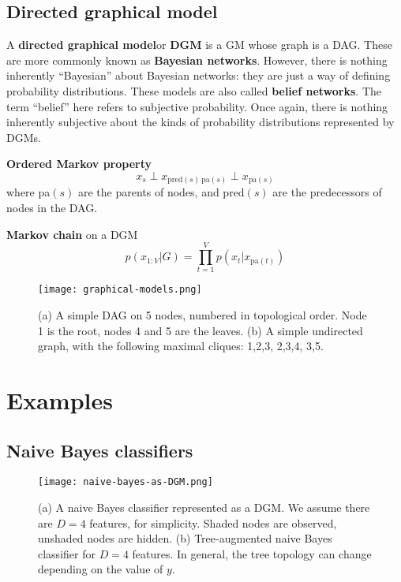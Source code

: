 \subsection{Directed graphical model}
A \textbf{directed graphical model}or \textbf{DGM} is a GM whose graph is a DAG. These are more commonly known as \textbf{Bayesian networks}. However, there is nothing inherently “Bayesian” about Bayesian networks: they are just a way of defining probability distributions. These models are also called \textbf{belief networks}. The term “belief” here refers to subjective probability. Once again, there is nothing inherently subjective about the kinds of probability distributions represented by DGMs.

\textbf{Ordered Markov property}
\begin{equation}
x_s \perp x_{\mathrm{pred}(s)\ \mathrm{pa}(s)} \perp x_{\mathrm{pa}(s)}
\end{equation}
where pa$(s)$ are the parents of nodes, and pred$(s)$ are the predecessors of nodes in the DAG.

\textbf{\textbf{Markov chain}} on a DGM
\begin{equation}
p(x_{1:V}|G)=\prod\limits_{t=1}^V p(x_t|x_{\mathrm{pa}(t)})
\end{equation}


\begin{figure}[hbtp]
\centering
    \texttt{[image: graphical-models.png]}
\caption{(a) A simple DAG on 5 nodes, numbered in topological order. Node 1 is the root, nodes 4 and 5 are the leaves. (b) A simple undirected graph, with the following maximal cliques: {1,2,3}, {2,3,4}, {3,5}.}
\label{fig:graphical-models} 
\end{figure}


\section{Examples}


\subsection{Naive Bayes classifiers}
\begin{figure}[hbtp]
\centering
    \texttt{[image: naive-bayes-as-DGM.png]}
\caption{(a) A naive Bayes classifier represented as a DGM. We assume there are $D=4$ features, for simplicity. Shaded nodes are observed, unshaded nodes are hidden. (b) Tree-augmented naive Bayes classifier for $D=4$ features. In general, the tree topology can change depending on the value of $y$.}
\label{fig:naive-bayes-as-DGM} 
\end{figure}



